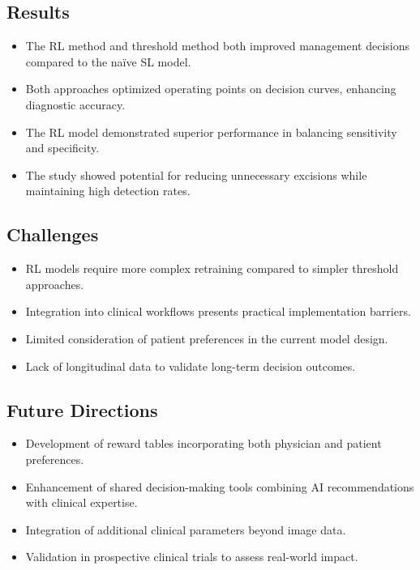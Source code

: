 \subsection*{Results}
\begin{itemize}
    \item The RL method and threshold method both improved management decisions compared to the naïve SL model.
    \item Both approaches optimized operating points on decision curves, enhancing diagnostic accuracy.
    \item The RL model demonstrated superior performance in balancing sensitivity and specificity.
    \item The study showed potential for reducing unnecessary excisions while maintaining high detection rates.
\end{itemize}

\subsection*{Challenges}
\begin{itemize}
    \item RL models require more complex retraining compared to simpler threshold approaches.
    \item Integration into clinical workflows presents practical implementation barriers.
    \item Limited consideration of patient preferences in the current model design.
    \item Lack of longitudinal data to validate long-term decision outcomes.
\end{itemize}

\subsection*{Future Directions}
\begin{itemize}
    \item Development of reward tables incorporating both physician and patient preferences.
    \item Enhancement of shared decision-making tools combining AI recommendations with clinical expertise.
    \item Integration of additional clinical parameters beyond image data.
    \item Validation in prospective clinical trials to assess real-world impact.
\end{itemize}

